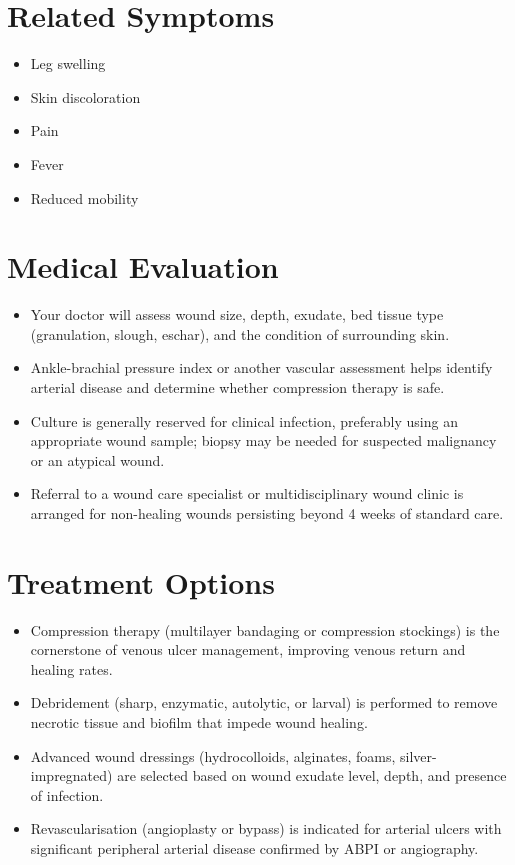 \section*{Related Symptoms}
\begin{itemize}
  \item Leg swelling
  \item Skin discoloration
  \item Pain
  \item Fever
  \item Reduced mobility
\end{itemize}

\section*{Medical Evaluation}
\begin{itemize}
  \item Your doctor will assess wound size, depth, exudate, bed tissue type (granulation, slough, eschar), and the condition of surrounding skin.
  \item Ankle-brachial pressure index or another vascular assessment helps identify arterial disease and determine whether compression therapy is safe.
  \item Culture is generally reserved for clinical infection, preferably using an appropriate wound sample; biopsy may be needed for suspected malignancy or an atypical wound.
  \item Referral to a wound care specialist or multidisciplinary wound clinic is arranged for non-healing wounds persisting beyond 4 weeks of standard care.
\end{itemize}

\section*{Treatment Options}
\begin{itemize}
  \item Compression therapy (multilayer bandaging or compression stockings) is the cornerstone of venous ulcer management, improving venous return and healing rates.
  \item Debridement (sharp, enzymatic, autolytic, or larval) is performed to remove necrotic tissue and biofilm that impede wound healing.
  \item Advanced wound dressings (hydrocolloids, alginates, foams, silver-impregnated) are selected based on wound exudate level, depth, and presence of infection.
  \item Revascularisation (angioplasty or bypass) is indicated for arterial ulcers with significant peripheral arterial disease confirmed by ABPI or angiography.
\end{itemize}

